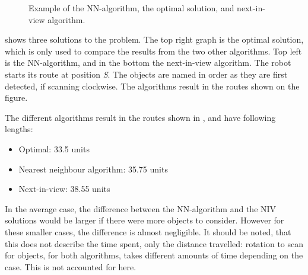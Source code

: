 \begin{figure}[H]
     \caption{\label{fig:algorithm-example} Example of the NN-algorithm, the optimal solution, and next-in-view algorithm.}
\end{figure}

 shows three solutions to the problem. The top right graph is the optimal solution, which is only used to compare the results from the two other algorithms. Top left is the NN-algorithm, and in the bottom the next-in-view algorithm. The robot starts its route at position \emph{S}. The objects are named in order as they are first detected, if scanning clockwise. The algorithms result in the routes shown on the figure.

The different algorithms result in the routes shown in , and have following lengths:
\begin{itemize}
\item Optimal: 33.5 units
\item Nearest neighbour algorithm: 35.75 units
\item Next-in-view: 38.55 units
\end{itemize}

In the average case, the difference between the NN-algorithm and the NIV solutions would be larger if there were more objects to consider. However for these smaller cases, the difference is almost negligible. It should be noted, that this does not describe the time spent, only the distance travelled: rotation to scan for objects, for both algorithms, takes different amounts of time depending on the case. This is not accounted for here.

